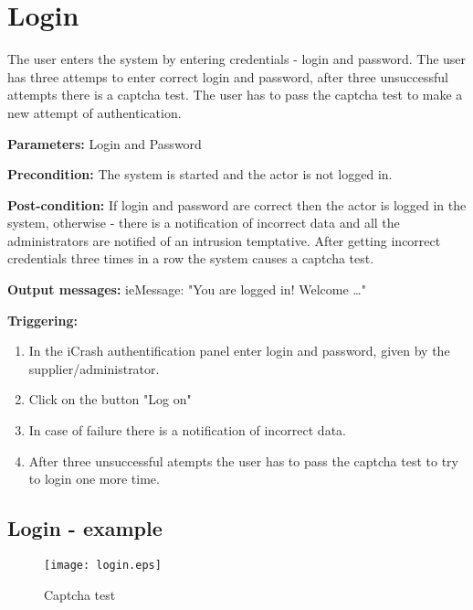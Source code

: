 \section{Login}
\label{operation:Login}

The user enters the system by entering credentials - login and password. The
user has three attemps to enter correct login and password, after three
unsuccessful attempts there is a captcha test. The user has to pass the captcha
test to make a new attempt of authentication.

\begin{description}
	\item \textbf{Parameters:} Login and Password
	\item \textbf{Precondition:} The system is started and the actor is not logged
	in. 
	\item \textbf{Post-condition:} If login and password are correct then the
	actor is logged in the system, otherwise - there is a notification
	of incorrect data and all the administrators are notified of an intrusion
	temptative. After getting incorrect credentials three times in a row the
	system causes a captcha test. 
	\item \textbf{Output messages:} ieMessage: "You are logged in! Welcome
	\ldots"
	
	\item \textbf{Triggering:}
	
	\begin{enumerate}
		\item In the iCrash authentification panel enter login and password, given by
		the supplier/administrator.
		\item Click on the button "Log on"
		\item In case of failure there is a notification of incorrect data.
		\item After three unsuccessful atempts the user has to pass the captcha test
		to try to login one more time.
	\end{enumerate}
\end{description}


\subsection{Login - example}

\begin{figure}[h]
    \texttt{[image: login.eps]}
	\caption{Captcha test}
\end{figure}



